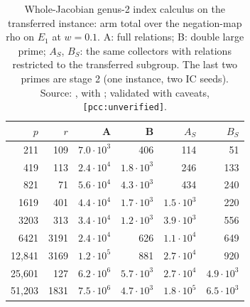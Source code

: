 \begin{table}[t]
\centering\footnotesize
\begin{tabular}{@{}rrrrrr@{}}
\toprule
$p$ & $r$ & A & B & $A_S$ & $B_S$ \\
\midrule
211 & 109 & $7.0\cdot10^3$ & 406 & 114 & 51 \\
419 & 113 & $2.4\cdot10^4$ & $1.8\cdot10^3$ & 246 & 133 \\
821 & 71 & $5.6\cdot10^4$ & $4.3\cdot10^3$ & 434 & 240 \\
1619 & 401 & $4.4\cdot10^4$ & $1.7\cdot10^3$ & $1.5\cdot10^3$ & 220 \\
3203 & 313 & $3.4\cdot10^4$ & $1.2\cdot10^3$ & $3.9\cdot10^3$ & 556 \\
6421 & 3191 & $2.4\cdot10^4$ & 626 & $1.1\cdot10^4$ & 649 \\
12{,}841 & 3169 & $1.2\cdot10^5$ & 881 & $2.7\cdot10^4$ & 920 \\
25{,}601 & 127 & $6.2\cdot10^6$ & $5.7\cdot10^3$ & $2.7\cdot10^4$ & $4.9\cdot10^3$ \\
51{,}203 & 1831 & $7.5\cdot10^6$ & $4.7\cdot10^3$ & $1.8\cdot10^5$ & $6.5\cdot10^3$ \\
\bottomrule
\end{tabular}
\caption[]{Whole-Jacobian genus-2 index calculus on the transferred
instance: arm total over the negation-map rho on $E_1$ at $w=0.1$. A: full
relations; B: double large prime; $A_S$, $B_S$: the same collectors with
relations restricted to the transferred subgroup. The last two primes are
stage 2 (one instance, two IC seeds). Source:
, with
; validated with caveats,
\texttt{[pcc:unverified]}.}
\label{tab:jac-o3}
\end{table}


